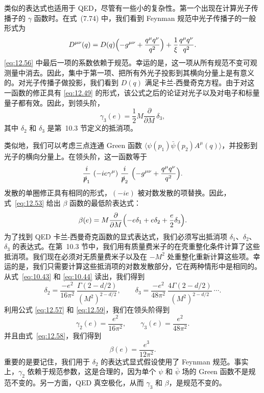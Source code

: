类似的表达式也适用于 QED，尽管有一些小的复杂性。第一个出现在计算光子传播子的 $\gamma$ 函数时。在式~(7.74) 中，我们看到 Feynman 规范中光子传播子的一般形式为
\begin{equation}
  D^{\mu\nu}(q) = D(q)\Bigl( -g^{\mu\nu} + \frac{q^\mu q^\nu}{q^2} \Bigr)
    + \frac{1}{\xi}\frac{q^\mu q^\nu}{q^2} .
  \label{eq:12.56}
\end{equation}
\eqref{eq:12.56} 中最后一项的系数依赖于规范。幸运的是，这一项从所有规范不变可观测量中消去。因此，集中于第一项、把所有外光子投影到其横向分量上是有意义的。对光子传播子做投影，我们看到 $D(q)$ 满足卡兰-西曼奇克方程。由于对这一函数的修正具有 \eqref{eq:12.49} 的形式，该公式之后的论证对光子以及对电子和标量量子都有效。因此，到领头阶，
\begin{equation}
  \gamma_3(e) = \frac{1}{2}M\frac{\partial}{\partial M}\,\delta_3 ,
  \label{eq:12.57}
\end{equation}
其中 $\delta_2$ 和 $\delta_3$ 是第~10.3 节定义的抵消项。

类似地，我们可以考虑三点连通 Green 函数 $\langle\psi(p_1)\bar{\psi}(p_2)A^\mu(q)\rangle$，并投影到光子的横向分量上。在领头阶，这一函数等于
\begin{equation}
  \frac{i}{\slashed{p}_1}\ (-ie\gamma^\mu)\ \frac{i}{\slashed{p}_2}\
  \Bigl( -g^{\mu\nu} + \frac{q^\mu q^\nu}{q^2} \Bigr) .
\end{equation}
发散的单圈修正具有相同的形式，$(-ie)$ 被对数发散的项替换。因此，式~\eqref{eq:12.53} 给出 $\beta$ 函数的最低阶表达式：
\begin{equation}
  \beta(e) = M\frac{\partial}{\partial M}\Bigl( -e\delta_1 + e\delta_2
    + \frac{e}{2}\delta_3 \Bigr) .
  \label{eq:12.58}
\end{equation}
为了找到 QED 卡兰-西曼奇克函数的显式表达式，我们必须写出抵消项 $\delta_1$、$\delta_2$、$\delta_3$ 的表达式。在第~10.3 节中，我们用有质量费米子的在壳重整化条件计算了这些抵消项。我们现在必须对无质量费米子以及在 $-M^2$ 处重整化重新计算这些项。幸运的是，我们只需要计算这些抵消项的对数发散部分，它在两种情形中是相同的。从式~\eqref{eq:10.43} 和 \eqref{eq:10.44} 读出，我们得到
\begin{equation}
  \delta_2 = \frac{-e^2}{16\pi^2}\ \frac{\Gamma(2-d/2)}{(M^2)^{2-d/2}},\qquad
  \delta_3 = \frac{-e^2}{48\pi^2}\ \frac{4\Gamma(2-d/2)}{(M^2)^{2-d/2}}
  \ \cdots .
  \label{eq:12.59}
\end{equation}
利用公式 \eqref{eq:12.57} 和 \eqref{eq:12.59}，我们在领头阶得到
\begin{equation}
  \gamma_2(e) = \frac{e^2}{16\pi^2},\qquad
  \gamma_3(e) = \frac{e^2}{48\pi^2} .
  \label{eq:12.60}
\end{equation}
并且由式~\eqref{eq:12.58}，我们得到
\begin{equation}
  \beta(e) = \frac{e^3}{12\pi^2} .
  \label{eq:12.61}
\end{equation}
重要的是要记住，我们用于 $\delta_2$ 的表达式显式假设使用了 Feynman 规范。事实上，$\gamma_2$ 依赖于规范参数，这是合理的，因为单个 $\psi$ 和 $\bar{\psi}$ 场的 Green 函数不是规范不变的。另一方面，QED 真空极化，从而 $\gamma_3$ 和 $\beta$，是规范不变的。

